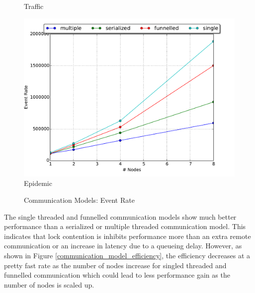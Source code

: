 \documentclass[11pt]{book}
\begin{document}
\begin{figure}
\begin{minipage}{.5\textwidth}
\begin{center}
      Traffic \\
    \end{center}
  \end{minipage}
  \centering
  \begin{minipage}{.5\textwidth}
    \begin{center}
      \includegraphics[width=\textwidth,keepaspectratio,quiet]{figs/partitioning_communication/communication_epidemic_eventrate.pdf} \\
      Epidemic \\
    \end{center}
  \end{minipage}
  \caption{Communication Models: Event Rate}\label{communication_model_eventrate}
\end{figure}

The single threaded and funnelled communication models show much better performance than a
serialized or multiple threaded communication model.  This indicates that lock contention is
inhibits performance more than an extra remote communication or an increase in latency due to a
queueing delay.  However, as shown in Figure \ref{communication_model_efficiency}, the efficiency
decreases at a pretty fast rate as the number of nodes increase for singled threaded and funnelled
communication which could lead to less performance gain as the number of nodes is scaled up.
\end{document}
